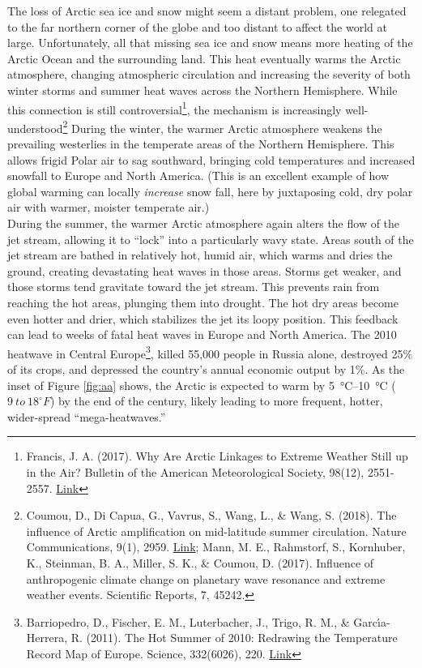 The loss of Arctic sea ice and snow might seem a distant problem, one relegated to the far northern corner of the globe and too distant to affect the world at large. Unfortunately, all that missing sea ice and snow means more heating of the Arctic Ocean and the surrounding land. This heat eventually warms the Arctic atmosphere, changing atmospheric circulation and increasing the severity of both winter storms and summer heat waves across the Northern Hemisphere. While this connection is still controversial\footnote{Francis, J. A. (2017). Why Are Arctic Linkages to Extreme Weather Still up in the Air? Bulletin of the American Meteorological Society, 98(12), 2551-2557. \href{https://doi.org/10.1175/BAMS-D-17-0006.1}{Link}}, the mechanism is increasingly well-understood\footnote{Coumou, D., Di Capua, G., Vavrus, S., Wang, L., \& Wang, S. (2018). The influence of Arctic amplification on mid-latitude summer circulation. Nature Communications, 9(1), 2959. \href{https://doi.org/10.1038/s41467-018-05256-8}{Link}; Mann, M. E., Rahmstorf, S., Kornhuber, K., Steinman, B. A., Miller, S. K., \& Coumou, D. (2017). Influence of anthropogenic climate change on planetary wave resonance and extreme weather events. Scientific Reports, 7, 45242.} During the winter, the warmer Arctic atmosphere weakens the prevailing westerlies in the temperate areas of the Northern Hemisphere. This allows frigid Polar air to sag southward, bringing cold temperatures and increased snowfall to Europe and North America. (This is an excellent example of how global warming can locally \emph{increase} snow fall, here by juxtaposing cold, dry polar air with warmer, moister temperate air.)\\
During the summer, the warmer Arctic atmosphere again alters the flow of the jet stream, allowing it to ``lock'' into a particularly wavy state. Areas south of the jet stream are bathed in relatively hot, humid air, which warms and dries the ground, creating devastating heat waves in those areas. Storms get weaker, and those storms tend gravitate toward the jet stream. This prevents rain from reaching the hot areas, plunging them into drought. The hot dry areas become even hotter and drier, which stabilizes the jet its loopy position. This feedback can lead to weeks of fatal heat waves in Europe and North America. The 2010 heatwave in Central Europe\footnote{Barriopedro, D., Fischer, E. M., Luterbacher, J., Trigo, R. M., \& Garc{\'\i}a-Herrera, R. (2011). The Hot Summer of 2010: Redrawing the Temperature Record Map of Europe. Science, 332(6026), 220. \href{https://doi.org/10.1126/science.1201224}{Link}}, killed 55,000 people in Russia alone, destroyed 25\% of its crops, and depressed the country's annual economic output by 1\%. As the inset of Figure \ref{fig:aa} shows, the Arctic is expected to warm by \SIrange{5}{10}{\celsius} ($9\ to \ 18^{\circ}F$) by the end of the century, likely leading to more frequent, hotter, wider-spread ``mega-heatwaves.''    


